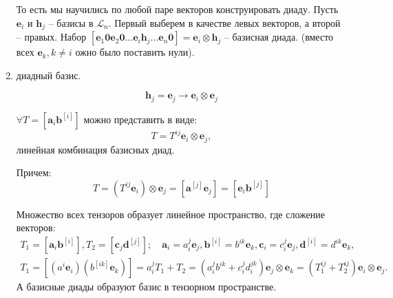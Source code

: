 \begin{definition}[геометрическое]
\begin{enumerate}
    То есть мы научились по любой паре векторов конструировать диаду. Пусть $\mathbf{e}_i$ и
    $\mathbf{h}_j$ -- базисы в $\mathcal{L}_n$. Первый выберем в качестве левых векторов, а
    второй -- правых. Набор $[\mathbf{e}_1 \mathbf{0} \mathbf{e}_2 \mathbf{0} \dots \mathbf{e}_i \mathbf{h}_j \dots \mathbf{e}_n \mathbf{0}] = \mathbf{e}_i \otimes \mathbf{h}_j$ -- базисная диада. (вместо всех $\mathbf{e}_k, k\neq i$ ожно было поставить нули). 

  \item диадный базис. %
  
  	\begin{equation*}
  		\mathbf{h}_j = \mathbf{e}_j \longrightarrow \mathbf{e}_i \otimes \mathbf{e}_j
  	\end{equation*}
  
    \begin{theorem}
      $\forall T = [\mathbf{a}_i \mathbf{b}^{[i]}]$ можно представить в виде: 
      \begin{equation}\label{lec_2:eq:tensor_basis}
        T = T^{ij} \mathbf{e}_i \otimes \mathbf{e}_j,
      \end{equation}
      линейная комбинация базисных диад.

      Причем:
      \[
        T = (T^{ij} \mathbf{e}_i) \otimes \mathbf{e}_j
        = [\mathbf{a}^{[j]} \mathbf{e}_j]
        = [\mathbf{e}_i \mathbf{b}^{[j]}]
      \]
    \end{theorem}
    \begin{theorem}[Следствие]
      Множество всех тензоров образует линейное пространство, где сложение векторов:
      \begin{multline*}
        T_1 = [\mathbf{a}_i \mathbf{b}^{[i]}],
        T_2 = [\mathbf{c}_j \mathbf{d}^{[j]}]; \quad
        \mathbf{a}_i = a^j_i \mathbf{e}_j,
        \mathbf{b}^{[i]} = b^{ik} \mathbf{e}_k,
        \mathbf{c}_i = c^{j}_{i} \mathbf{e}_j, 
        \mathbf{d}^{[i]} = d^{ik} \mathbf{e}_k, \quad \\
        T_1 = [(a^i \mathbf{e}_i) (b^{[ik]} \mathbf{e}_k)] = a^j_i 
        T_1 + T_2 = (a^j_i b^{ik} + c^{j}_i d^{jk}_i) \mathbf{e}_j \otimes \mathbf{e}_k
        = (T_1^{ij} + T_2^{ij}) \mathbf{e}_i \otimes \mathbf{e}_j.
      \end{multline*}
      А базисные диады образуют базис в тензорном пространстве.
    \end{theorem}
  \end{enumerate}
\end{definition}

